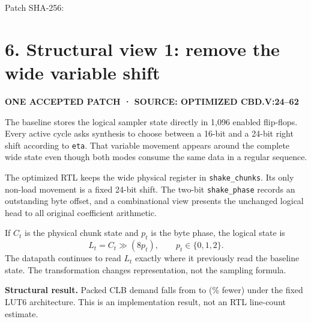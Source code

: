 \documentclass[10pt,a4paper]{article}
\newcommand{\hash}[1]{{\scriptsize\ttfamily\seqsplit{#1}}}
\newcommand{\smallcaps}[1]{\textcolor{Mid}{\fontsize{8.5}{10}\selectfont\bfseries\MakeUppercase{#1}}}
\newcommand{\newpageheading}[2]{\clearpage\section{#1}\smallcaps{#2}\vspace{6pt}}
\begin{document}
Patch SHA-256: \hash{\PatchHash}

\newpageheading{6. Structural view 1: remove the wide variable shift}{One accepted patch · source: optimized cbd.v:24--62}

The baseline stores the logical sampler state directly in 1,096 enabled flip-flops. Every active cycle asks synthesis to choose between a 16-bit and a 24-bit right shift according to \texttt{eta}. That variable movement appears around the complete wide state even though both modes consume the same data in a regular sequence.

\begin{center}
\end{center}

The optimized RTL keeps the wide physical register in \texttt{shake\_chunks}. Its only non-load movement is a fixed 24-bit shift. The two-bit \texttt{shake\_phase} records an outstanding byte offset, and a combinational view presents the unchanged logical head to all original coefficient arithmetic.

If $C_t$ is the physical chunk state and $p_t$ is the byte phase, the logical state is
\[
L_t = C_t \gg (8p_t), \qquad p_t\in\{0,1,2\}.
\]
The datapath continues to read $L_t$ exactly where it previously read the baseline state. The transformation changes representation, not the sampling formula.

\begin{claimbox}
\textbf{Structural result.} Packed CLB demand falls from \BaselineClb{} to \OptimizedClb{} (\ClbImprovement\% fewer) under the fixed LUT6 architecture. This is an implementation result, not an RTL line-count estimate.
\end{claimbox}
\end{document}
